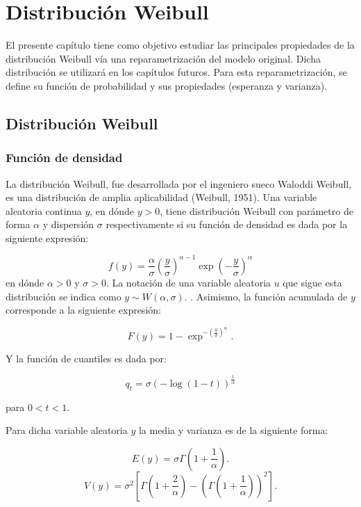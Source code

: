 \chapter{Distribución Weibull}

El presente capítulo tiene como objetivo estudiar las principales propiedades de la distribución Weibull vía una reparametrización del modelo original. Dicha distribución se utilizará en los capítulos futuros. Para esta reparametrización, se define su función de probabilidad y sus propiedades (esperanza y varianza).

\section{Distribución Weibull}

\subsection{Función de densidad}

La distribución Weibull, fue desarrollada por el ingeniero sueco Waloddi Weibull, es una distribución de amplia aplicabilidad (Weibull, 1951). Una variable aleatoria continua $y$, en dónde $y > 0$, tiene distribución Weibull con parámetro de forma $\alpha$ y dispersión $\sigma$ respectivamente si su función de densidad es dada por la siguiente expresión:

\begin{equation*}
f{(y)}= \frac{\alpha}{\sigma}\left(\frac{y}{\sigma}\right)^{\alpha-1} \exp{\left(-\frac{y}{\sigma}\right)^{\alpha}}
\end{equation*}
\noindent en dónde $\alpha > 0$ y $\sigma > 0$. La notación de una variable aleatoria $u$ que sigue esta distribución se indica como $y \sim W(\alpha,\sigma)$.
.
Asimismo, la función acumulada de $y$ corresponde a la siguiente expresión:

\[F{(y)}=1-\exp^{-{(\frac{y}{\sigma})}^{\alpha}}.\]

Y la función de cuantiles es dada por:

\[q_{t}=\sigma{(-\log{(1-t)})}^{\frac{1}{\alpha}}\]

\noindent para $0 < t < 1$.

Para dicha variable aleatoria $y$ la media y varianza es de la siguiente forma:

\[E(y)=\sigma \Gamma\left( 1+\frac{1}{\alpha} \right).\]
\[V(y)=\sigma^{2}\left[ \Gamma\left( 1+\frac{2}{\alpha} \right)-\left( \Gamma\left( 1+\frac{1}{\alpha} \right) \right)^{2} \right].\]

